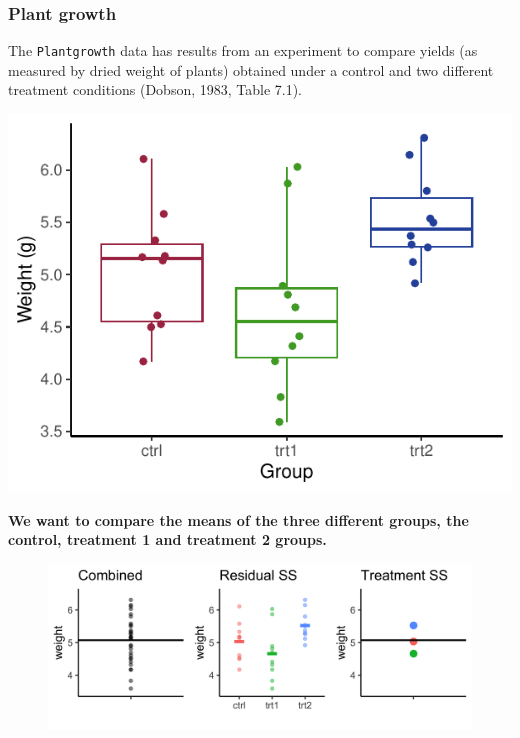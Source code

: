 \documentclass[a4paper]{article}
\begin{document}
\subsubsection{Plant growth}
The \lstinline|Plantgrowth| data has results from an experiment to compare yields (as measured by dried weight of plants) obtained under a control and two different treatment conditions (Dobson, 1983, Table 7.1).
\begin{Schunk}


{\centering \includegraphics[width=\maxwidth]{figure/listings-unnamed-chunk-222-1} 

}

\end{Schunk}
\begin{greenbox}
	\textbf{We want to compare the means of the three different groups, the control, treatment 1 and treatment 2 groups.}
\end{greenbox}
\begin{figure}[H]
	\centering
	\includegraphics[scale=0.15]{plantgrowth}
\end{figure}
\end{document}
